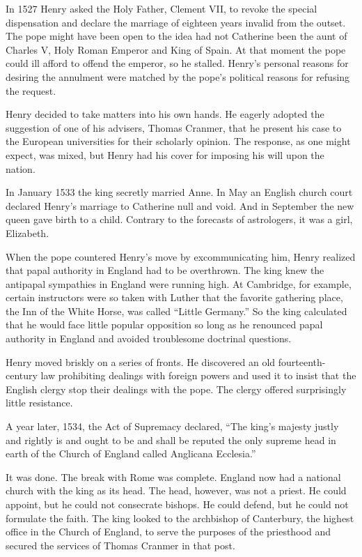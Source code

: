 In 1527 Henry asked the Holy Father, Clement VII, to revoke the special dispensation and declare the
marriage of eighteen years invalid from the outset. The pope might have been open to the idea had
not Catherine been the aunt of Charles V, Holy Roman Emperor and King of Spain. At that moment the
pope could ill afford to offend the emperor, so he stalled. Henry’s personal reasons for desiring
the annulment were matched by the pope’s political reasons for refusing the request.

Henry decided to take matters into his own hands. He eagerly adopted the suggestion of one of his
advisers, Thomas Cranmer, that he present his case to the European universities for their scholarly
opinion. The response, as one might expect, was mixed, but Henry had his cover for imposing his will
upon the nation.

In January 1533 the king secretly married Anne. In May an English church court declared Henry’s
marriage to Catherine null and void. And in September the new queen gave birth to a child. Contrary
to the forecasts of astrologers, it was a girl, Elizabeth.

When the pope countered Henry’s move by excommunicating him, Henry realized that papal authority in
England had to be overthrown. The king knew the antipapal sympathies in England were running high.
At Cambridge, for example, certain instructors were so taken with Luther that the favorite gathering
place, the Inn of the White Horse, was called “Little Germany.” So the king calculated that he would
face little popular opposition so long as he renounced papal authority in England and avoided
troublesome doctrinal questions.

Henry moved briskly on a series of fronts. He discovered an old fourteenth-century law prohibiting
dealings with foreign powers and used it to insist that the English clergy stop their dealings with
the pope. The clergy offered surprisingly little resistance.

A year later, 1534, the Act of Supremacy declared, “The king’s majesty justly and rightly is and
ought to be and shall be reputed the only supreme head in earth of the Church of England called
Anglicana Ecclesia.”

It was done. The break with Rome was complete. England now had a national church with the king as
its head. The head, however, was not a priest. He could appoint, but he could not consecrate
bishops. He could defend, but he could not formulate the faith. The king looked to the archbishop of
Canterbury, the highest office in the Church of England, to serve the purposes of the priesthood and
secured the services of Thomas Cranmer in that post.

